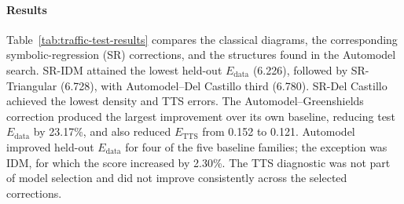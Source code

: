\paragraph{Results}
Table~\ref{tab:traffic-test-results} compares the classical diagrams, the
corresponding symbolic-regression (SR) corrections, and the structures found in
the Automodel search. SR-IDM attained the lowest held-out $E_{\mathrm{data}}$
(6.226), followed by SR-Triangular (6.728), with Automodel--Del Castillo third
(6.780). SR-Del Castillo achieved the lowest density and TTS errors. The
Automodel--Greenshields correction produced the largest improvement over its
own baseline, reducing test $E_{\mathrm{data}}$ by 23.17\%, and also reduced
$E_{\mathrm{TTS}}$ from 0.152 to 0.121. Automodel improved held-out
$E_{\mathrm{data}}$ for four of the five baseline families; the exception was
IDM, for which the score increased by 2.30\%. The TTS diagnostic was not part of
model selection and did not improve consistently across the selected
corrections.

